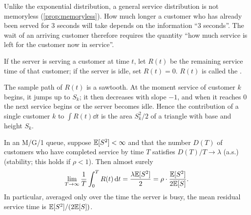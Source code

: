 
Unlike the exponential distribution, a general service distribution is not
memoryless (\cref{prop:memoryless}). How much longer a customer who has already
been served for 3 seconds will take depends on the information ``3 seconds''.
The wait of an arriving customer therefore requires the quantity ``how much
service is left for the customer now in service''.

\begin{definition}\label{L3:def:residual}
If the server is serving a customer at time $t$, let $R(t)$ be the remaining
service time of that customer; if the server is idle, set $R(t)=0$. $R(t)$ is
called the .
\end{definition}

The sample path of $R(t)$ is a sawtooth. At the moment service of customer $k$
begins, it jumps up to $S_k$; it then decreases with slope $-1$, and when it
reaches 0 the next service begins or the server becomes idle. Hence the
contribution of a single customer $k$ to $\int R(t)\dd t$ is the area $S_k^2/2$
of a triangle with base and height $S_k$.

\begin{lemma}\label{lem:residual}
In an M/G/1 queue, suppose $\mathbb{E}[S^2]<\infty$ and that the number $D(T)$ of
customers who have completed service by time $T$ satisfies $D(T)/T\to\lambda$
(a.s.) (stability; this holds if $\rho<1$). Then almost surely
\[
  \lim_{T\to\infty}\frac1T\int_0^T R(t)\,\mathrm{d} t=\frac{\lambda\mathbb{E}[S^2]}{2}
  =\rho\cdot\frac{\mathbb{E}[S^2]}{2\mathbb{E}[S]}.
\]
In particular, averaged only over the time the server is busy, the mean residual
service time is $\mathbb{E}[S^2]/(2\mathbb{E}[S])$.
\end{lemma}

